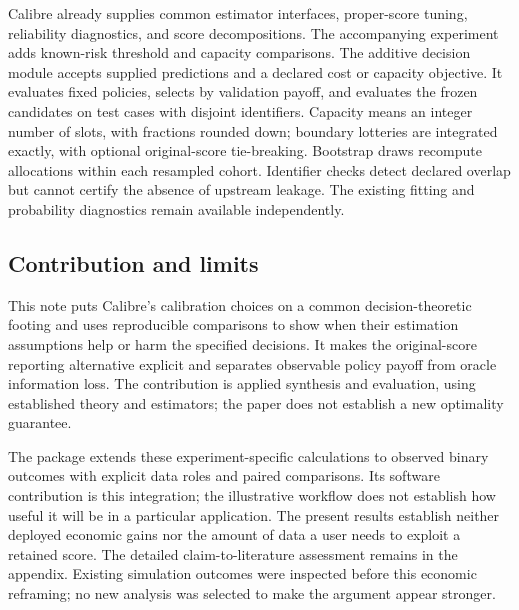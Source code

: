 \documentclass[11pt]{article}
\begin{document}
Calibre already supplies common estimator interfaces, proper-score tuning, reliability diagnostics, and score decompositions. The accompanying experiment adds known-risk threshold and capacity comparisons. The additive decision module accepts supplied predictions and a declared cost or capacity objective. It evaluates fixed policies, selects by validation payoff, and evaluates the frozen candidates on test cases with disjoint identifiers. Capacity means an integer number of slots, with fractions rounded down; boundary lotteries are integrated exactly, with optional original-score tie-breaking. Bootstrap draws recompute allocations within each resampled cohort. Identifier checks detect declared overlap but cannot certify the absence of upstream leakage. The existing fitting and probability diagnostics remain available independently.

\subsection{Contribution and limits}
This note puts Calibre's calibration choices on a common decision-theoretic footing and uses reproducible comparisons to show when their estimation assumptions help or harm the specified decisions. It makes the original-score reporting alternative explicit and separates observable policy payoff from oracle information loss. The contribution is applied synthesis and evaluation, using established theory and estimators; the paper does not establish a new optimality guarantee.

The package extends these experiment-specific calculations to observed binary outcomes with explicit data roles and paired comparisons. Its software contribution is this integration; the illustrative workflow does not establish how useful it will be in a particular application. The present results establish neither deployed economic gains nor the amount of data a user needs to exploit a retained score. The detailed claim-to-literature assessment remains in the appendix. Existing simulation outcomes were inspected before this economic reframing; no new analysis was selected to make the argument appear stronger.

\clearpage
\appendix

\end{document}
